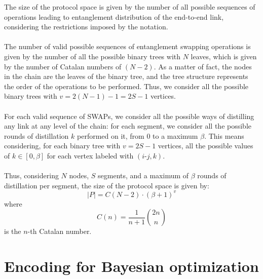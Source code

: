 \documentclass{article}
\begin{document}
The size of the protocol space is given by the number of all possible sequences of operations leading to entanglement distribution of the end-to-end link, considering the restrictions imposed by the notation.
\\\\
The number of valid possible sequences of entanglement swapping operations is given by the number of all the possible binary trees with $N$ leaves, which is given by the number of Catalan numbers of $(N-2)$. As a matter of fact, the nodes in the chain are the leaves of the binary tree, and the tree structure represents the order of the operations to be performed.
Thus, we consider all the possible binary trees with $v = 2(N-1) - 1 = 2S - 1$ vertices.
\\\\
For each valid sequence of SWAPs, we consider all the possible ways of distilling any link at any level of the chain: for each segment, we consider all the possible rounds of distillation $k$ performed on it, from 0 to a maximum $\beta$. 
This means considering, for each binary tree with $v = 2S - 1$ vertices, all the possible values of $k \in [0, \beta]$ for each vertex labeled with $(i\text{-}j, k)$.
\\\\
Thus, considering $N$ nodes, $S$ segments, and a maximum of $\beta$ rounds of distillation per segment, the size of the protocol space is given by:
\begin{equation}
    |P| = C(N-2) \cdot (\beta+1)^v
\end{equation}
where
\begin{equation}
  C(n) = \frac{1}{n+1} \binom{2n}{n}
\end{equation}
is the $n$-th Catalan number.

\clearpage
\section*{Encoding for Bayesian optimization}
\end{document}
